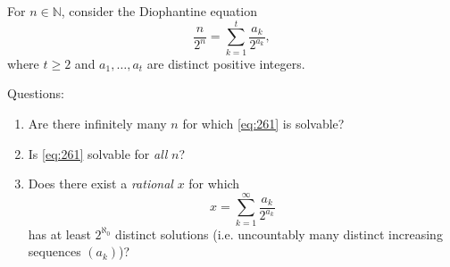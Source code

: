 For $n\in\mathbb{N}$, consider the Diophantine equation
\begin{equation}
\label{eq:261}
\frac{n}{2^n}=\sum_{k=1}^{t}\frac{a_k}{2^{a_k}},
\end{equation}
where $t\ge 2$ and $a_1,\dots,a_t$ are distinct positive integers.

Questions:
\begin{enumerate}[label=(\alph*),leftmargin=2em]
\item Are there infinitely many $n$ for which \eqref{eq:261} is solvable?
\item Is \eqref{eq:261} solvable for \emph{all} $n$?
\item Does there exist a \emph{rational} $x$ for which
\[
 x = \sum_{k=1}^{\infty}\frac{a_k}{2^{a_k}}
\]
has at least $2^{\aleph_0}$ distinct solutions (i.e. uncountably many distinct increasing sequences $(a_k)$)?
\end{enumerate}
